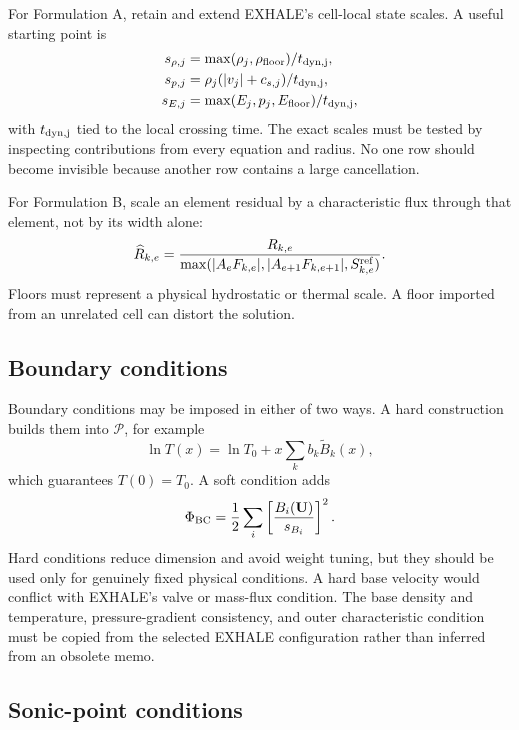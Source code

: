 \documentclass[english,a4paper]{my_memo}
\newcommand{\vect}[1]{\mathbf{#1}}
\newcommand{\Ustate}{\vect{U}}
\begin{document}
For Formulation A, retain and extend EXHALE's cell-local state scales.  A useful
starting point is
\begin{align}
 s_{\rho,j} &= \max(\rho_j,\rho_{\rm floor})/t_{\rm dyn,j},\\
 s_{p,j} &= \rho_j(|v_j|+c_{s,j})/t_{\rm dyn,j},\\
 s_{E,j} &= \max(E_j,p_j,E_{\rm floor})/t_{\rm dyn,j},
 \label{eq:scales}
\end{align}
with \(t_{\rm dyn,j}\) tied to the local crossing time.  The exact scales must
be tested by inspecting contributions from every equation and radius.  No one
row should become invisible because another row contains a large cancellation.

For Formulation B, scale an element residual by a characteristic flux through
that element, not by its width alone:
\begin{equation}
 \widehat R_{k,e}=\frac{R_{k,e}}
 {\max(|A_eF_{k,e}|,|A_{e+1}F_{k,e+1}|,S_{k,e}^{\rm ref})}.
 \label{eq:weakscale}
\end{equation}
Floors must represent a physical hydrostatic or thermal scale.  A floor imported
from an unrelated cell can distort the solution.

\subsection{Boundary conditions}

Boundary conditions may be imposed in either of two ways.  A hard construction
builds them into \(\mathcal{P}\), for example
\begin{equation}
 \ln T(x)=\ln T_0+x\sum_k b_k\widetilde B_k(x),
 \label{eq:hardbc}
\end{equation}
which guarantees \(T(0)=T_0\).  A soft condition adds
\begin{equation}
 \Phi_{\rm BC}=\frac{1}{2}\sum_i
 \left[\frac{B_i(\Ustate)}{s_{B_i}}\right]^2.
 \label{eq:softbc}
\end{equation}
Hard conditions reduce dimension and avoid weight tuning, but they should be
used only for genuinely fixed physical conditions.  A hard base velocity would
conflict with EXHALE's valve or mass-flux condition.  The base density and
temperature, pressure-gradient consistency, and outer characteristic condition
must be copied from the selected EXHALE configuration rather than inferred from
an obsolete memo.

\subsection{Sonic-point conditions}
\end{document}
